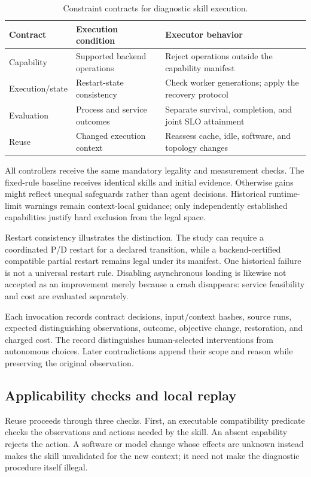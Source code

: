 \documentclass[11pt,a4paper]{article}
\begin{document}
\begin{table}[htbp]
\centering\small
\begin{tabularx}{\linewidth}{@{}>{\raggedright\arraybackslash}p{29mm}YY@{}}
\toprule
Contract & Execution condition & Executor behavior \\
\midrule
Capability & Supported backend operations & Reject operations outside the capability manifest \\
Execution/state & Restart-state consistency & Check worker generations; apply the recovery protocol \\
Evaluation & Process and service outcomes & Separate survival, completion, and joint SLO attainment \\
Reuse & Changed execution context & Reassess cache, idle, software, and topology changes \\
\bottomrule
\end{tabularx}
\caption{Constraint contracts for diagnostic skill execution.}
\label{tab:contracts}
\end{table}

All controllers receive the same mandatory legality and measurement checks. The fixed-rule baseline receives identical skills and initial evidence. Otherwise gains might reflect unequal safeguards rather than agent decisions. Historical runtime-limit warnings remain context-local guidance; only independently established capabilities justify hard exclusion from the legal space.

Restart consistency illustrates the distinction. The study can require a coordinated P/D restart for a declared transition, while a backend-certified compatible partial restart remains legal under its manifest. One historical failure is not a universal restart rule. Disabling asynchronous loading is likewise not accepted as an improvement merely because a crash disappears: service feasibility and cost are evaluated separately.

Each invocation records contract decisions, input/context hashes, source runs, expected distinguishing observations, outcome, objective change, restoration, and charged cost. The record distinguishes human-selected interventions from autonomous choices. Later contradictions append their scope and reason while preserving the original observation.

\subsection{Applicability checks and local replay}
Reuse proceeds through three checks. First, an executable compatibility predicate checks the observations and actions needed by the skill. An absent capability rejects the action. A software or model change whose effects are unknown instead makes the skill unvalidated for the new context; it need not make the diagnostic procedure itself illegal.
\end{document}
